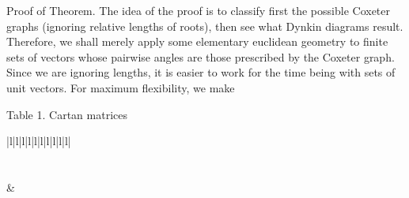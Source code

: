 \documentclass[10pt]{article}
\begin{document}
Proof of Theorem. The idea of the proof is to classify first the possible Coxeter graphs (ignoring relative lengths of roots), then see what Dynkin diagrams result. Therefore, we shall merely apply some elementary euclidean geometry to finite sets of vectors whose pairwise angles are those prescribed by the Coxeter graph. Since we are ignoring lengths, it is easier to work for the time being with sets of unit vectors. For maximum flexibility, we make

Table 1. Cartan matrices

\begin{center}
\begin{tabular}{|l|l|l|l|l|l|l|l|l|l|}
\hline
{} \\
\hline
{} \\
\hline
{} \\
\hline
{} & 
\end{tabular}
\end{center}
\end{document}
